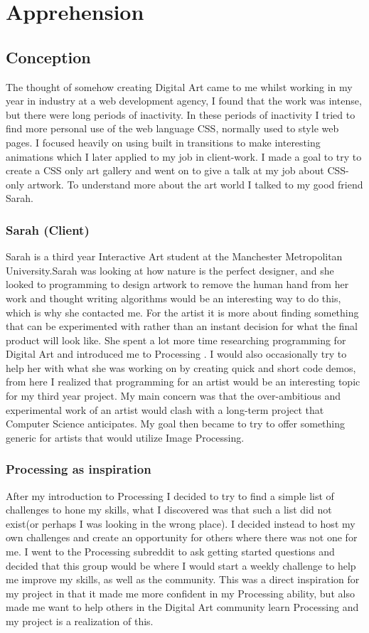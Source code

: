 \documentclass[a4paper]{report}
\begin{document}
\chapter{Apprehension}
\section{Conception}
The thought of somehow creating Digital Art came to me whilst working in my year in industry at a web development agency, I found that the work was intense, but there were long periods of inactivity. In these periods of inactivity I tried to find more personal use of the web language CSS, normally used to style web pages. I focused heavily on using built in transitions to make interesting animations which I later applied to my job in client-work. I made a goal to try to create a CSS only art gallery and went on to give a talk at my job about CSS-only artwork. To understand more about the art world I talked to my good friend Sarah.

\subsection{Sarah (Client)}
Sarah is a third year Interactive Art student at the Manchester Metropolitan University.Sarah was looking at how nature is the perfect designer, and she looked to programming to design artwork to remove the human hand from her work and thought writing algorithms would be an interesting way to do this, which is why she contacted me. For the artist it is more about finding something that can be experimented with rather than an instant decision for what the final product will look like. She spent a lot more time researching programming for Digital Art and introduced me to Processing \cite{PROCESSING}. I would also occasionally try to help her with what she was working on by creating quick and short code demos, from here I realized that programming for an artist would be an interesting topic for my third year project. My main concern was that the over-ambitious and experimental work of an artist would clash with a long-term project that Computer Science anticipates. My goal then became to try to offer something generic for artists that would utilize Image Processing. 

\subsection{Processing as inspiration}
After my introduction to Processing I decided to try to find a simple list of challenges to hone my skills, what I discovered was that such a list did not exist(or perhaps I was looking in the wrong place). I decided instead to host my own challenges and create an opportunity for others where there was not one for me. I went to the Processing subreddit\cite{RPROCESSING} to ask getting started questions and decided that this group would be where I would start a weekly challenge to help me improve my skills, as well as the community. This was a direct inspiration for my project in that it made me more confident in my Processing ability, but also made me want to help others in the Digital Art community learn Processing and my project is a realization of this.
\end{document}
